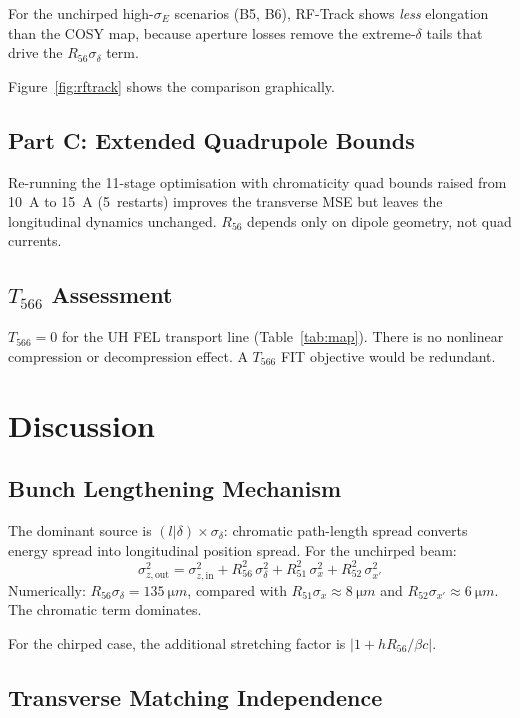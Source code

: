 \documentclass[11pt]{article}
\begin{document}
For the unchirped high-$\sigma_E$ scenarios (B5, B6), RF-Track shows
\emph{less} elongation than the COSY map, because aperture losses
remove the extreme-$\delta$ tails that drive the $R_{56} \sigma_\delta$
term.

Figure~\ref{fig:rftrack} shows the comparison graphically.


\subsection{Part C: Extended Quadrupole Bounds}

Re-running the 11-stage optimisation with chromaticity quad bounds
raised from \SI{10}{A} to \SI{15}{A} (5~restarts) improves the
transverse MSE but leaves the longitudinal dynamics unchanged.
$R_{56}$ depends only on dipole geometry, not quad currents.


\subsection{$T_{566}$ Assessment}

$T_{566} = 0$ for the UH FEL transport line (Table~\ref{tab:map}).
There is no nonlinear compression or decompression effect.  A
$T_{566}$ FIT objective would be redundant.


\section{Discussion}

\subsection{Bunch Lengthening Mechanism}

The dominant source is $(l|\delta) \times \sigma_\delta$: chromatic
path-length spread converts energy spread into longitudinal position
spread.  For the unchirped beam:
\begin{equation}
  \sigma_{z,\text{out}}^2 = \sigma_{z,\text{in}}^2
    + R_{56}^2\,\sigma_\delta^2
    + R_{51}^2\,\sigma_x^2 + R_{52}^2\,\sigma_{x'}^2
\end{equation}
Numerically: $R_{56}\sigma_\delta = \SI{135}{\micro m}$, compared
with $R_{51}\sigma_x \approx \SI{8}{\micro m}$ and
$R_{52}\sigma_{x'} \approx \SI{6}{\micro m}$.  The chromatic term
dominates.

For the chirped case, the additional stretching factor is
$|1 + h R_{56}/\beta c|$.

\subsection{Transverse Matching Independence}
\end{document}
